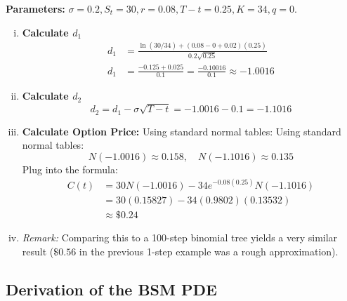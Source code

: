 \textbf{Parameters: } \(\sigma = 0.2, S_t = 30, r = 0.08, T-t = 0.25, K = 34, q = 0\).
\begin{enumerate}[i.]
    \item \textbf{Calculate \(d_1\)}
    \begin{align*}
    d_1 &= \frac{\ln(30/34) + (0.08 - 0 + 0.02)(0.25)}{0.2\sqrt{0.25}} \\
    d_1 &= \frac{-0.125 + 0.025}{0.1} = \frac{-0.10016}{0.1} \approx -1.0016
    \end{align*}

    \item \textbf{Calculate \(d_2\)}
    \begin{equation*}
        d_2 = d_1 - \sigma\sqrt{T-t} = -1.0016 - 0.1 = -1.1016
    \end{equation*}

    \item \textbf{Calculate Option Price: } Using standard normal tables:
    Using standard normal tables:
    \begin{equation*}
        N(-1.0016) \approx 0.158, \quad N(-1.1016) \approx 0.135
    \end{equation*}
    Plug into the formula:
    \begin{align*}
        C(t) &= 30 N(-1.0016) - 34 e^{-0.08(0.25)} N(-1.1016) \\
        &= 30(0.15827) - 34(0.9802)(0.13532) \\
        &\approx \boxed{\$0.24}
    \end{align*}

    \item \textit{Remark:} Comparing this to a 100-step binomial tree yields a very similar result (\(\$0.56\) in the previous 1-step example was a rough approximation).
\end{enumerate}

\subsection{Derivation of the BSM PDE}
